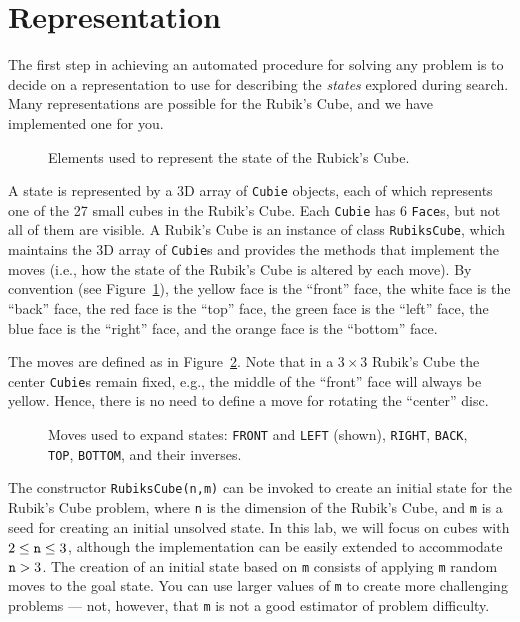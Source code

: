 \documentclass[a4paper]{article}
\begin{document}
\section{Representation}

The first step in achieving an automated procedure for solving any problem is to decide on a representation to use for describing the {\em states} explored during search.  Many representations are possible for the Rubik's Cube, and we have implemented one for you.

\begin{figure}[!ht]
\centering

\caption{{\small Elements used to represent the state of the Rubick's Cube.}}
\label{fig:rcState}
\end{figure}

A state is represented by a 3D array of {\tt Cubie} objects, each of which represents one of the 27 small cubes in the Rubik's Cube.  Each {\tt Cubie} has 6 {\tt Face}s, but not all of them are visible.  A Rubik's Cube is an instance of class {\tt RubiksCube}, which maintains the 3D array of {\tt Cubie}s and provides the methods that implement the moves (i.e., how the state of the Rubik's Cube is altered by each move).  By convention (see Figure~\ref{fig:rcState}), the yellow face is the ``front'' face, the white face is the ``back'' face, the red face is the ``top'' face, the green face is the ``left'' face, the blue face is the ``right'' face, and the orange face is the ``bottom'' face.  

The moves are defined as in Figure~\ref{fig:rcMoves}.  Note that in a $3 \times 3$ Rubik's Cube the center {\tt Cubie}s remain fixed, e.g., the middle of the ``front'' face will always be yellow.  Hence, there is no need to define a move for rotating the ``center'' disc.

\begin{figure}[!ht]
\centering

\caption{{\small Moves used to expand states: {\tt FRONT} and {\tt LEFT} (shown), {\tt RIGHT}, {\tt BACK}, {\tt TOP}, {\tt BOTTOM}, and their inverses.}}
\label{fig:rcMoves}
\end{figure}

The constructor {\tt RubiksCube(n,m)} can be invoked to create an initial state for the Rubik's Cube problem, where {\tt n} is the dimension of the Rubik's Cube, and {\tt m} is a seed for creating an initial unsolved state.  In this lab, we will focus on cubes with $2 \leq \text{{\tt n}} \leq 3$, although the implementation can be easily extended to accommodate $\text{{\tt n}} > 3$.  The creation of an initial state based on {\tt m} consists of applying {\tt m} random moves to the goal state.  You can use larger values of {\tt m} to create more challenging problems --- not, however, that {\tt m} is not a good estimator of problem difficulty.
\end{document}
